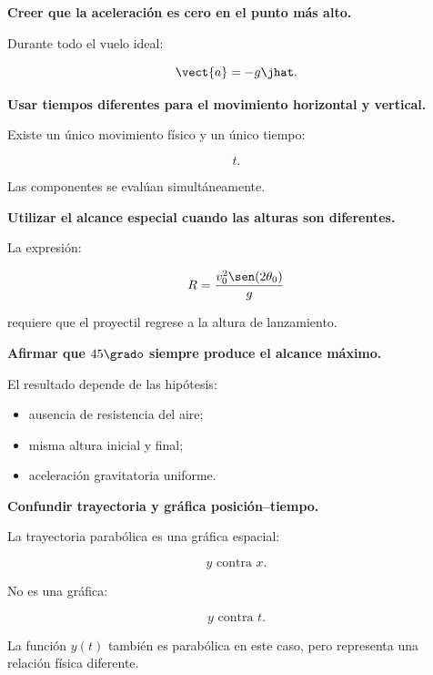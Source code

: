 \begin{errorfrecuente}
\textbf{Creer que la aceleración es cero en el punto más alto.}

Durante todo el vuelo ideal:

\[
\vect{a}=-g\jhat.
\]
\end{errorfrecuente}


\begin{errorfrecuente}
\textbf{Usar tiempos diferentes para el movimiento horizontal y vertical.}

Existe un único movimiento físico y un único tiempo:

\[
t.
\]

Las componentes se evalúan simultáneamente.
\end{errorfrecuente}


\begin{errorfrecuente}
\textbf{Utilizar el alcance especial cuando las alturas son diferentes.}

La expresión:

\[
R
=
\frac{
v_0^2\sen(2\theta_0)
}{
g
}
\]

requiere que el proyectil regrese a la altura de lanzamiento.
\end{errorfrecuente}


\begin{errorfrecuente}
\textbf{Afirmar que \(45\grado\) siempre produce el alcance máximo.}

El resultado depende de las hipótesis:

\begin{itemize}
    \item ausencia de resistencia del aire;
    \item misma altura inicial y final;
    \item aceleración gravitatoria uniforme.
\end{itemize}
\end{errorfrecuente}


\begin{errorfrecuente}
\textbf{Confundir trayectoria y gráfica posición--tiempo.}

La trayectoria parabólica es una gráfica espacial:

\[
y\text{ contra }x.
\]

No es una gráfica:

\[
y\text{ contra }t.
\]

La función \(y(t)\) también es parabólica en este caso, pero representa una
relación física diferente.
\end{errorfrecuente}


